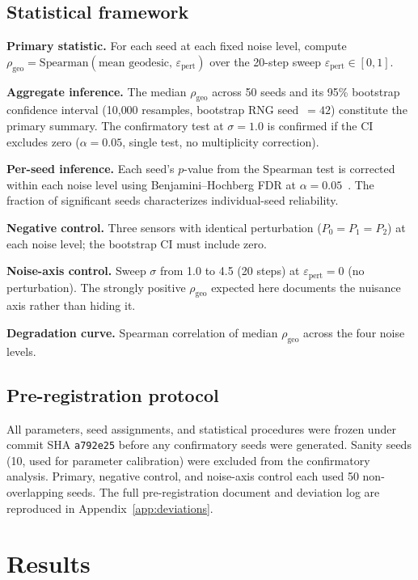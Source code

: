 \documentclass[11pt]{article}
\newcommand{\eps}{\varepsilon}
\newcommand{\epspert}{\eps_\mathrm{pert}}
\newcommand{\rhogeo}{\rho_\mathrm{geo}}
\begin{document}
\subsection{Statistical framework}

\textbf{Primary statistic.}  For each seed at each fixed noise
level, compute $\rhogeo = \mathrm{Spearman}(\text{mean geodesic},
\, \epspert)$ over the 20-step sweep $\epspert \in [0, 1]$.

\textbf{Aggregate inference.}  The median $\rhogeo$ across 50
seeds and its 95\% bootstrap confidence interval
\citep{efron1979bootstrap} (10{,}000 resamples, bootstrap RNG
seed~$= 42$) constitute the primary summary.  The confirmatory
test at $\sigma = 1.0$ is confirmed if the CI excludes zero
($\alpha = 0.05$, single test, no multiplicity correction).

\textbf{Per-seed inference.}  Each seed's $p$-value from the
Spearman test is corrected within each noise level using
Benjamini--Hochberg FDR at $\alpha =
0.05$~\citep{benjamini1995controlling}.  The fraction of
significant seeds characterizes individual-seed reliability.

\textbf{Negative control.}  Three sensors with identical
perturbation ($P_0 = P_1 = P_2$) at each noise level; the
bootstrap CI must include zero.

\textbf{Noise-axis control.}  Sweep $\sigma$ from 1.0 to 4.5
(20 steps) at $\epspert = 0$ (no perturbation).  The strongly
positive $\rhogeo$ expected here documents the nuisance axis
rather than hiding it.

\textbf{Degradation curve.}  Spearman correlation of median
$\rhogeo$ across the four noise levels.

\subsection{Pre-registration protocol}

All parameters, seed assignments, and statistical procedures were
frozen under commit SHA \texttt{a792e25} before any confirmatory
seeds were generated.  Sanity seeds (10, used for parameter
calibration) were excluded from the confirmatory analysis.
Primary, negative control, and noise-axis control each used 50
non-overlapping seeds.  The full pre-registration document and
deviation log are reproduced in Appendix~\ref{app:deviations}.

\section{Results}
\label{sec:results}
\end{document}
